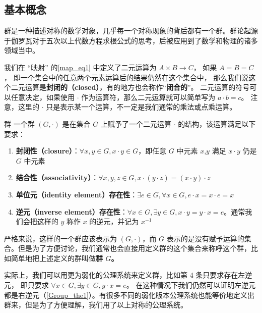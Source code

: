 

\subsection{基本概念}
群是一种描述对称的数学对象，几乎每一个对称现象的背后都有一个群。群论起源于伽罗瓦对于五次以上代数方程求根公式的思考，后被应用到了数学和物理的诸多领域当中。

我们在 “映射” 的\autoref{map_eq1} 中定义了二元运算为 $A \times B \to C$， 如果 $A = B = C$， 即一个集合中的任意两个元素运算后的结果仍然在这个集合中， 那么我们说这个二元运算是\textbf{封闭的（closed）}，有的地方也会称作“\textbf{闭合的}”。 二元运算的符号可以任意决定，如果使用 $\cdot$ 作为运算符，那么二元运算就可以简单写为 $a \cdot b=c$。 注意，这里的 $\cdot$ 只是表示某一个运算，不一定是我们通常的乘法或点乘运算。

\begin{definition}{群}\label{Group_def1}
一个群 $(G, \cdot)$ 是在集合 $G$ 上赋予了一个二元运算 $\cdot$ 的结构，该运算满足以下要求：
\begin{enumerate}
\item \textbf{封闭性（closure）}：$\forall x, y\in G, x\cdot y\in G$，即任意 $G$ 中元素 $x$,$y$ 满足 $x\cdot y$ 仍是 $G$ 中元素
\item \textbf{结合性（associativity）}：$\forall x, y, z\in G, x\cdot(y\cdot z)=(x\cdot y)\cdot z$
\item \textbf{单位元（identity element）存在性}：$\exists e\in G, \forall x\in G, e\cdot x=x\cdot e=x$
\item \textbf{逆元（inverse element）存在性}：$\forall x\in G, \exists y\in G, x\cdot y=y\cdot x=e$。通常我们会把这样的 $y$ 称作 $x$ 的逆元，并记为 $x^{-1}$
\end{enumerate}
\end{definition}
严格来说，这样的一个群应该表示为 $(G,\cdot)$，而 $G$ 表示的是没有赋予运算的集合。但是为了方便讨论，我们通常也会直接用定义群的这个集合来称呼这个群，比如简单地把上述定义的群叫做\textbf{群 $G$。}

实际上，我们可以用更为弱化的公理系统来定义群，比如第 4 条只要求存在左逆元， 即只要求 $\forall x\in G, \exists y\in G, y\cdot x=e$。 在这种情况下我们仍然可以证明左逆元都是右逆元（\autoref{Group_the1}）。有很多不同的弱化版本公理系统也能等价地定义出群来，但是为了方便理解，我们用了以上对称的公理系统。

